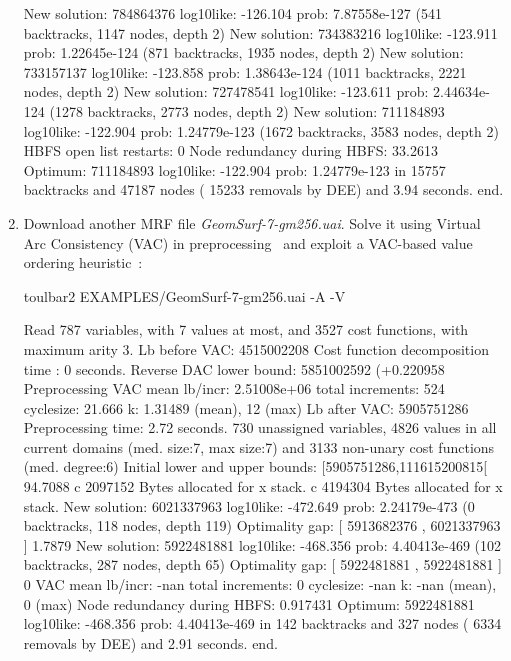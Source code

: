 \begin{enumerate}
{\begin{DoxyCode}
New solution: 784864376 log10like: -126.104 prob: 7.87558e-127 (541 backtracks, 1147 nodes, depth 2)
New solution: 734383216 log10like: -123.911 prob: 1.22645e-124 (871 backtracks, 1935 nodes, depth 2)
New solution: 733157137 log10like: -123.858 prob: 1.38643e-124 (1011 backtracks, 2221 nodes, depth 2)
New solution: 727478541 log10like: -123.611 prob: 2.44634e-124 (1278 backtracks, 2773 nodes, depth 2)
New solution: 711184893 log10like: -122.904 prob: 1.24779e-123 (1672 backtracks, 3583 nodes, depth 2)
HBFS open list restarts: 0 %
Node redundancy during HBFS: 33.2613 %
Optimum: 711184893 log10like: -122.904 prob: 1.24779e-123 in 15757 backtracks and 47187 nodes ( 15233 removals by DEE) and 3.94 seconds.
end.
\end{DoxyCode}}
\item Download another MRF file {\em GeomSurf-7-gm256.uai}. Solve it using Virtual Arc Consistency (VAC) in preprocessing~\cite{Cooper08} and exploit a VAC-based value ordering heuristic~\cite{Cooper10a}:
\begin{DoxyCode}
	toulbar2 EXAMPLES/GeomSurf-7-gm256.uai -A -V
\end{DoxyCode}
{\scriptsize
\begin{DoxyCode}
Read 787 variables, with 7 values at most, and 3527 cost functions, with maximum arity 3.
Lb before VAC: 4515002208
Cost function decomposition time : 0 seconds.
Reverse DAC lower bound: 5851002592 (+0.220958%
Preprocessing VAC mean lb/incr: 2.51008e+06     total increments: 524     cyclesize: 21.666     k: 1.31489 (mean), 12 (max)
Lb after VAC: 5905751286
Preprocessing time: 2.72 seconds.
730 unassigned variables, 4826 values in all current domains (med. size:7, max size:7) and 3133 non-unary cost functions (med. degree:6)
Initial lower and upper bounds: [5905751286,111615200815[ 94.7088%
c 2097152 Bytes allocated for x stack.
c 4194304 Bytes allocated for x stack.
New solution: 6021337963 log10like: -472.649 prob: 2.24179e-473 (0 backtracks, 118 nodes, depth 119)
Optimality gap: [ 5913682376 , 6021337963 ] 1.7879 %
New solution: 5922481881 log10like: -468.356 prob: 4.40413e-469 (102 backtracks, 287 nodes, depth 65)
Optimality gap: [ 5922481881 , 5922481881 ] 0 %
VAC mean lb/incr: -nan     total increments: 0     cyclesize: -nan     k: -nan (mean), 0 (max)
Node redundancy during HBFS: 0.917431 %
Optimum: 5922481881 log10like: -468.356 prob: 4.40413e-469 in 142 backtracks and 327 nodes ( 6334 removals by DEE) and 2.91 seconds.
end.
\end{DoxyCode}}

\end{enumerate}
